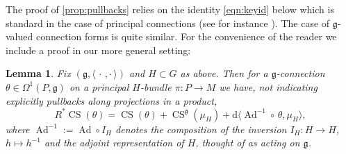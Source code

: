 \documentclass[british,11pt,a4paper]{amsart}
\numberwithin{equation}{section}
\renewcommand\frak{\mathfrak}
\newcommand{\B}[2]{\langle#1,#2\rangle}
\newcommand{\CS}{\operatorname{CS}}
\newcommand{\Ad}{\operatorname{Ad}}
\renewcommand*{\d}{\mathrm{d}}
\newcommand{\col}{:}
\newcounter{theorem}
\numberwithin{theorem}{section}
\newtheorem{lemma}[theorem]{Lemma}
\theoremstyle{definition}
\theoremstyle{remark}
\begin{document}
  The proof of \cref{prop:pullbacks} relies on the identity \eqref{eqn:keyid} below
  which is standard in the case of principal connections (see for instance
  \cite{MR1337109}). The case of $\mathfrak{g}$-valued connection forms is quite
  similar. For the convenience of the reader we include a proof in our more
  general setting: 
  \begin{lemma} Fix $(\frak{g},\B{\,\cdot\,}{\cdot\,})$ and $H\subset G$ as above.
  Then for a $\mathfrak{g}$-connection $\theta \in \Omega^1(P,\mathfrak{g})$ on a
  principal $H$-bundle $\pi \col P \to M$ we have, not indicating explicitly
  pullbacks along projections in a product,
  \begin{equation}\label{eqn:keyid}
  R^*\CS(\theta)=\CS(\theta)+\CS^{\frak g}(\mu_H)+\d\B{\Ad^{-1}\circ\,\theta}{\mu_H},
  \end{equation}
  where $\Ad^{-1}\col=\Ad\circ I_H$ denotes the composition of the inversion $I_H \col H \to H$, $h \mapsto h^{-1}$ and the adjoint representation of $H$, thought of as acting on $\mathfrak{g}$.
  \end{lemma}
\end{document}
